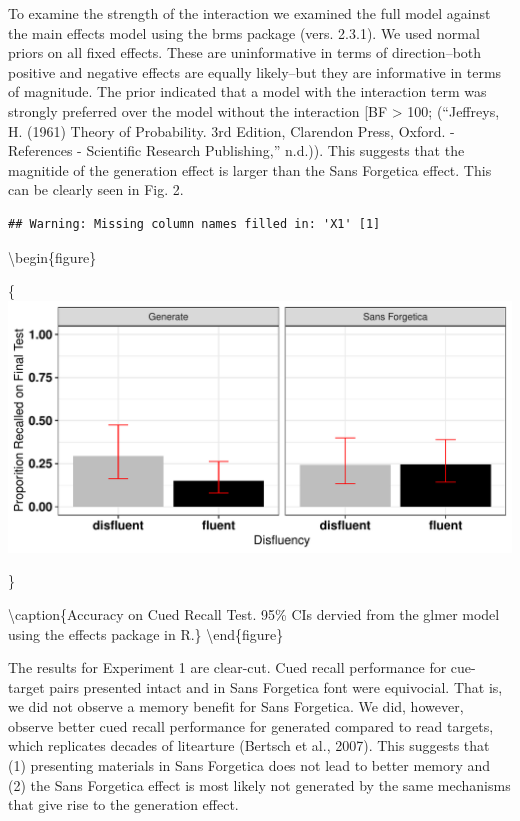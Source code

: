 \documentclass[english,doc]{apa6}
\begin{document}
To examine the strength of the interaction we examined the full model against the main effects model using the brms package (vers. 2.3.1). We used normal priors on all fixed effects. These are uninformative in terms of direction--both positive and negative effects are equally likely--but they are informative in terms of magnitude. The prior indicated that a model with the interaction term was strongly preferred over the model without the interaction {[}BF \textgreater{} 100; (``Jeffreys, H. (1961) Theory of Probability. 3rd Edition, Clarendon Press, Oxford. - References - Scientific Research Publishing,'' n.d.)). This suggests that the magnitide of the generation effect is larger than the Sans Forgetica effect. This can be clearly seen in Fig. 2.

\begin{verbatim}
## Warning: Missing column names filled in: 'X1' [1]
\end{verbatim}

\textbackslash{}begin\{figure\}

\{\centering \includegraphics{SF_Paper_files/figure-latex/unnamed-chunk-2-1}

\}

\textbackslash{}caption\{Accuracy on Cued Recall Test. 95\% CIs dervied from the glmer model using the effects package in R.\}\label{fig:unnamed-chunk-2}
\textbackslash{}end\{figure\}

The results for Experiment 1 are clear-cut. Cued recall performance for cue-target pairs presented intact and in Sans Forgetica font were equivocial. That is, we did not observe a memory benefit for Sans Forgetica. We did, however, observe better cued recall performance for generated compared to read targets, which replicates decades of litearture (Bertsch et al., 2007). This suggests that (1) presenting materials in Sans Forgetica does not lead to better memory and (2) the Sans Forgetica effect is most likely not generated by the same mechanisms that give rise to the generation effect.
\end{document}
